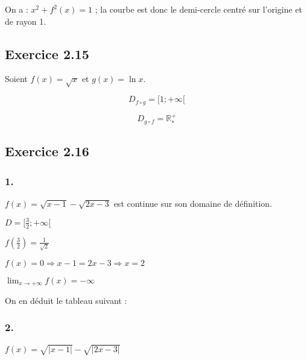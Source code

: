 \documentclass[a4paper,10pt]{report}
\begin{document}

On a : $x^2 + f^2(x) = 1$ ; la courbe est donc le demi-cercle centré sur l'origine et de rayon 1.

\subsection*{Exercice 2.15}

Soient $f(x) = \sqrt{x}$ et $g(x)= \ln x$.

\begin{displaymath}
	D_{f \circ g} = [1 ; +\infty[
\end{displaymath}

\begin{displaymath}
	D_{g \circ f} = \mathbb{R}^{+}_{*}
\end{displaymath}


\subsection*{Exercice 2.16}
\subsubsection*{1.}
$f(x) = \sqrt{x-1} - \sqrt{2x-3}$ est continue sur son domaine de définition.

$D = [\frac{3}{2} ; +\infty[$

$f(\frac{3}{2}) = \frac{1}{\sqrt{2}}$

$f(x) = 0 \Rightarrow x-1 = 2x-3 \Rightarrow x = 2 $

$\lim_{x \rightarrow +\infty} f(x) = -\infty$

On en déduit le tableau suivant :


\subsubsection*{2.}
$f(x) = \sqrt{|x-1|} - \sqrt{|2x-3|}$
\end{document}
